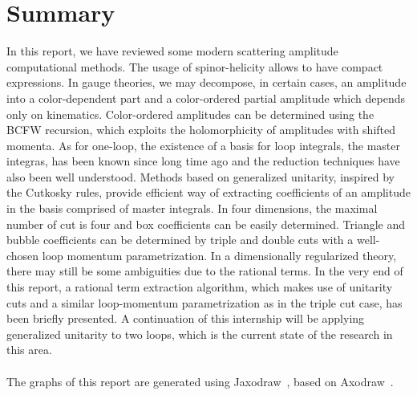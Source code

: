 \section{Summary}
In this report, we have reviewed some modern scattering amplitude computational methods. 
The usage of spinor-helicity allows to have compact expressions.
In gauge theories, we may decompose, in certain cases, an amplitude into a color-dependent part and a color-ordered partial amplitude which depends only on kinematics.
Color-ordered amplitudes can be determined using the BCFW recursion, which exploits the holomorphicity of amplitudes with shifted momenta. 
As for one-loop, the existence of a basis for loop integrals, the master integras, has been known since long time ago and the reduction techniques have also been well understood. 
Methods based on generalized unitarity, inspired by the Cutkosky rules, provide efficient way of extracting coefficients of an amplitude in the basis comprised of master integrals. 
In four dimensions, the maximal number of cut is four and box coefficients can be easily determined. 
Triangle and bubble coefficients can be determined by triple and double cuts with a well-chosen loop momentum parametrization.
In a dimensionally regularized theory, there may still be some ambiguities due to the rational terms. 
In the very end of this report, a rational term extraction algorithm, which makes use of unitarity cuts and a similar loop-momentum parametrization as in the triple cut case, has been briefly presented. 
A continuation of this internship will be applying generalized unitarity to two loops, which is the current state of the research in this area.   
\\\\
The graphs of this report are generated using Jaxodraw~\cite{Binosi:2003yf}, based on Axodraw~\cite{1994CoPhC..83...45V}.


